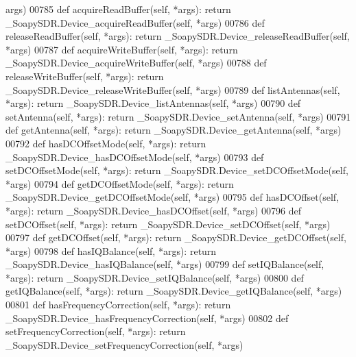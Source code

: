 \begin{DoxyCode}
{{{{{      args)
00785     \textcolor{keyword}{def }acquireReadBuffer(self, *args): \textcolor{keywordflow}{return} \_SoapySDR.Device\_acquireReadBuffer(self, *args)
00786     \textcolor{keyword}{def }releaseReadBuffer(self, *args): \textcolor{keywordflow}{return} \_SoapySDR.Device\_releaseReadBuffer(self, *args)
00787     \textcolor{keyword}{def }acquireWriteBuffer(self, *args): \textcolor{keywordflow}{return} \_SoapySDR.Device\_acquireWriteBuffer(self, *args)
00788     \textcolor{keyword}{def }releaseWriteBuffer(self, *args): \textcolor{keywordflow}{return} \_SoapySDR.Device\_releaseWriteBuffer(self, *args)
00789     \textcolor{keyword}{def }listAntennas(self, *args): \textcolor{keywordflow}{return} \_SoapySDR.Device\_listAntennas(self, *args)
00790     \textcolor{keyword}{def }setAntenna(self, *args): \textcolor{keywordflow}{return} \_SoapySDR.Device\_setAntenna(self, *args)
00791     \textcolor{keyword}{def }getAntenna(self, *args): \textcolor{keywordflow}{return} \_SoapySDR.Device\_getAntenna(self, *args)
00792     \textcolor{keyword}{def }hasDCOffsetMode(self, *args): \textcolor{keywordflow}{return} \_SoapySDR.Device\_hasDCOffsetMode(self, *args)
00793     \textcolor{keyword}{def }setDCOffsetMode(self, *args): \textcolor{keywordflow}{return} \_SoapySDR.Device\_setDCOffsetMode(self, *args)
00794     \textcolor{keyword}{def }getDCOffsetMode(self, *args): \textcolor{keywordflow}{return} \_SoapySDR.Device\_getDCOffsetMode(self, *args)
00795     \textcolor{keyword}{def }hasDCOffset(self, *args): \textcolor{keywordflow}{return} \_SoapySDR.Device\_hasDCOffset(self, *args)
00796     \textcolor{keyword}{def }setDCOffset(self, *args): \textcolor{keywordflow}{return} \_SoapySDR.Device\_setDCOffset(self, *args)
00797     \textcolor{keyword}{def }getDCOffset(self, *args): \textcolor{keywordflow}{return} \_SoapySDR.Device\_getDCOffset(self, *args)
00798     \textcolor{keyword}{def }hasIQBalance(self, *args): \textcolor{keywordflow}{return} \_SoapySDR.Device\_hasIQBalance(self, *args)
00799     \textcolor{keyword}{def }setIQBalance(self, *args): \textcolor{keywordflow}{return} \_SoapySDR.Device\_setIQBalance(self, *args)
00800     \textcolor{keyword}{def }getIQBalance(self, *args): \textcolor{keywordflow}{return} \_SoapySDR.Device\_getIQBalance(self, *args)
00801     \textcolor{keyword}{def }hasFrequencyCorrection(self, *args): \textcolor{keywordflow}{return} \_SoapySDR.Device\_hasFrequencyCorrection(self, *args)
00802     \textcolor{keyword}{def }setFrequencyCorrection(self, *args): \textcolor{keywordflow}{return} \_SoapySDR.Device\_setFrequencyCorrection(self, *args)
}}}}}
\end{DoxyCode}
